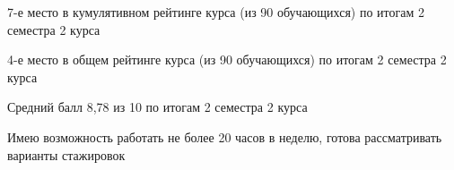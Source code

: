 

\begin{cventries}

\cventry
{} 
{}
{}
{} 
{
 \begin{cvitems}
\item {7-е место в кумулятивном рейтинге курса (из 90 обучающихся) по итогам 2 семестра 2 курса}
\item {4-е место в общем рейтинге курса (из 90 обучающихся) по итогам 2 семестра 2 курса}
\item {Средний балл 8,78 из 10 по итогам 2 семестра 2 курса}
\item {Имею возможность работать не более 20 часов в неделю, готова рассматривать варианты стажировок}
 \end{cvitems}
}

\end{cventries}